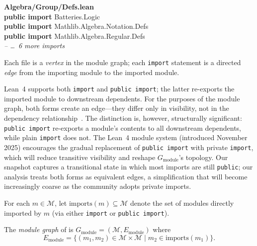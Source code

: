 \begin{codebox}
\textsf{\bfseries\color{blue!60!black}Algebra/Group/Defs.lean}\\[2pt]
\textbf{public import} \textcolor{blue!60!black}{Batteries.Logic}\\
\textbf{public import} \textcolor{blue!60!black}{Mathlib.Algebra.Notation.Defs}\\
\textbf{public import} \textcolor{blue!60!black}{Mathlib.Algebra.Regular.Defs}\\
\hspace{1.5em}\textit{\color{gray}-- \ldots\ 6 more imports}
\end{codebox}

\noindent
Each file is a \emph{vertex} in the module graph; each \texttt{import} statement is a directed \emph{edge} from the importing module to the imported module.

Lean~4 supports both \texttt{import} and \texttt{public import}; the latter re-exports the imported module to downstream dependents. For the purposes of the module graph, both forms create an edge---they differ only in visibility, not in the dependency relationship~\cite{lean4modules}. The distinction is, however, structurally significant: \texttt{public import} re-exports a module's contents to all downstream dependents, while plain \texttt{import} does not. The Lean~4 module system (introduced November 2025) encourages the gradual replacement of \texttt{public import} with private \texttt{import}, which will reduce transitive visibility and reshape $G_{\mathrm{module}}$'s topology. Our snapshot captures a transitional state in which most imports are still \texttt{public}; our analysis treats both forms as equivalent edges, a simplification that will become increasingly coarse as the community adopts private imports.

\begin{definition}
For each $m \in \mathcal{M}$, let $\mathrm{imports}(m) \subseteq \mathcal{M}$ denote the set of modules directly imported by $m$ (via either \texttt{import} or \texttt{public import}).
\end{definition}

\begin{definition}\label{def:module-graph}
The \emph{module graph} of  is $G_{\mathrm{module}} = (\mathcal{M}, E_{\mathrm{module}})$ where
\[
  E_{\mathrm{module}} = \{(m_1, m_2) \in \mathcal{M} \times \mathcal{M} \mid m_2 \in \mathrm{imports}(m_1)\}.
\]
\end{definition}

